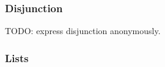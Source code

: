 \documentclass[a4paper]{article}
\begin{document}
\begin{minipage}{0.8\textwidth}
  \begin{flushleft}
    \begin{prooftree}
    \end{prooftree}

    \begin{prooftree}
    \end{prooftree}
  \end{flushleft}
\end{minipage}
\begin{minipage}{0.2\textwidth}
  \begin{flushright}
    \begin{prooftree}
    \end{prooftree}

    \begin{prooftree}
    \end{prooftree}
  \end{flushright}
\end{minipage}

\subsubsection{Disjunction}

\begin{prooftree}
\end{prooftree}

TODO: express disjunction anonymously.

\subsubsection{Lists}

\begin{prooftree}
\end{prooftree}
\end{document}
